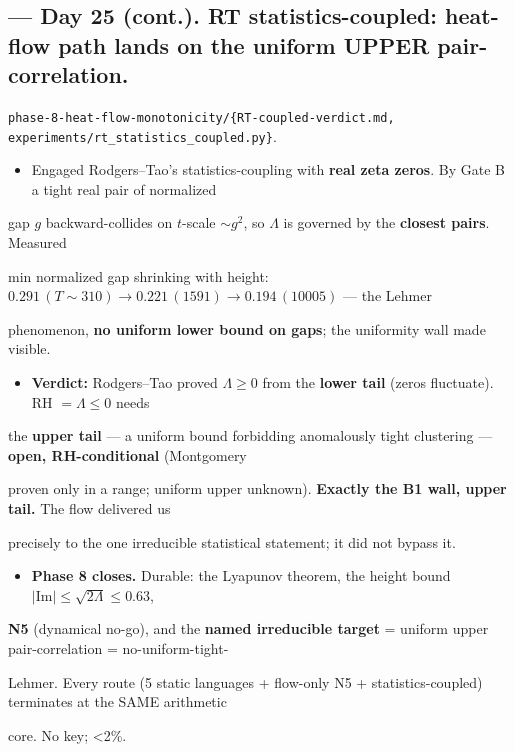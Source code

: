 \documentclass[10pt]{article}
\begin{document}
\subsection*{ --- Day 25 (cont.). RT statistics-coupled: heat-flow path lands on the uniform UPPER pair-correlation.}
\texttt{phase-8-heat-flow-monotonicity/\{RT-coupled-verdict.md, experiments/rt\_statistics\_coupled.py\}}.\par
\begin{itemize}
\item Engaged Rodgers--Tao's statistics-coupling with \textbf{real zeta zeros}. By Gate B a tight real pair of normalized
\end{itemize}
  gap $g$ backward-collides on $t$-scale $\sim g^2$, so $\Lambda$ is governed by the \textbf{closest pairs}. Measured\par
  min normalized gap shrinking with height: $0.291\,(T{\sim}310)\to0.221\,(1591)\to0.194\,(10005)$ --- the Lehmer\par
  phenomenon, \textbf{no uniform lower bound on gaps}; the uniformity wall made visible.\par
\begin{itemize}
\item \textbf{Verdict:} Rodgers--Tao proved $\Lambda\ge0$ from the \textbf{lower tail} (zeros fluctuate). RH $=\Lambda\le0$ needs
\end{itemize}
  the \textbf{upper tail} --- a uniform bound forbidding anomalously tight clustering --- \textbf{open, RH-conditional} (Montgomery\par
  proven only in a range; uniform upper unknown). \textbf{Exactly the B1 wall, upper tail.} The flow delivered us\par
  precisely to the one irreducible statistical statement; it did not bypass it.\par
\begin{itemize}
\item \textbf{Phase 8 closes.} Durable: the Lyapunov theorem, the height bound $|\mathrm{Im}|\le\sqrt{2\Lambda}\le0.63$,
\end{itemize}
  \textbf{N5} (dynamical no-go), and the \textbf{named irreducible target} = uniform upper pair-correlation = no-uniform-tight-\par
  Lehmer. Every route (5 static languages + flow-only N5 + statistics-coupled) terminates at the SAME arithmetic\par
  core. No key; <2\%.\par
\end{document}
